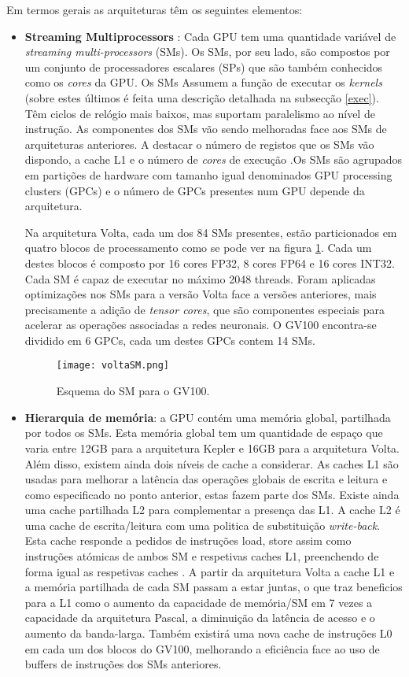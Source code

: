 Em termos gerais as arquiteturas têm os seguintes elementos:
\begin{itemize}
\item \textbf{Streaming Multiprocessors} : Cada GPU tem uma quantidade variável de \textit{streaming multi-processors} (SMs). Os SMs, por seu lado, são compostos por um conjunto de processadores escalares (SPs) que são também conhecidos como os \textit{cores} da GPU. Os SMs Assumem a função de executar os \textit{kernels} (sobre estes últimos é feita uma descrição detalhada na subsecção \ref{exec}). Têm ciclos de relógio mais baixos, mas suportam paralelismo ao nível de instrução. As componentes dos SMs vão sendo melhoradas face aos SMs de arquiteturas anteriores. A destacar o número de registos que os SMs vão dispondo, a cache L1 e o número de \textit{cores} de execução \cite{wilt_2013}.Os SMs são agrupados em partições de hardware com tamanho igual denominados GPU processing clusters (GPCs) e o número de GPCs presentes num GPU depende da arquitetura.  \par
Na arquitetura Volta, cada um dos 84 SMs presentes, estão particionados em quatro blocos de processamento como se pode ver na figura \ref{voltaSM}. Cada um destes blocos é composto por 16 cores FP32, 8 cores FP64 e 16 cores INT32. Cada SM é capaz de executar no máximo 2048 threads. Foram aplicadas optimizações nos SMs para a versão Volta face a versões anteriores, mais precisamente a adição de \textit{tensor cores}, que são componentes especiais para acelerar as operações associadas a redes neuronais. O GV100 encontra-se dividido em 6 GPCs, cada um destes GPCs contem 14 SMs.
 \begin{figure}[ht]
  \centering
    {\texttt{[image: voltaSM.png]}}
  \caption{Esquema do SM para o GV100\cite{voltaArch}.}
  \label{voltaSM}
 \end{figure}
%
\item \textbf{Hierarquia de memória}: a GPU contém uma memória global, partilhada por todos os SMs. Esta memória global tem um quantidade de espaço que varia entre 12GB para a arquitetura Kepler e 16GB para a arquitetura Volta.  Além disso, existem ainda dois níveis de cache a considerar. As caches L1 são usadas para melhorar a latência das operações globais de escrita e leitura e como especificado no ponto anterior, estas fazem parte dos SMs. Existe ainda uma cache partilhada L2 para complementar a presença das L1. A cache L2 é uma cache de escrita/leitura com uma politica de substituição \textit{write-back}. Esta cache responde a pedidos de instruções load, store assim como instruções atómicas de ambos SM e respetivas caches L1, preenchendo de forma igual as respetivas caches \cite{nickolls2010gpu}. A partir da arquitetura Volta a cache L1 e a memória partilhada de cada SM passam a estar juntas, o que traz beneficios para a L1 como o aumento da capacidade de memória/SM em 7 vezes a capacidade da arquitetura Pascal, a diminuição da latência de acesso e o aumento da banda-larga\cite{voltaArch}.  Também existirá uma nova cache de instruções L0 em cada um dos blocos do GV100, melhorando a eficiência face ao uso de buffers de instruções dos SMs anteriores. 

\end{itemize}
